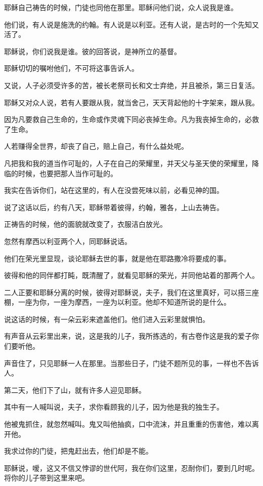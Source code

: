 \documentclass[12pt,oneside]{book}
\begin{document}
耶稣自己祷告的时候，门徒也同他在那里。耶稣问他们说，众人说我是谁。

他们说，有人说是施洗的约翰。有人说是以利亚。还有人说，是古时的一个先知又活了。

耶稣说，你们说我是谁。彼的回答说，是神所立的基督。

耶稣切切的嘱咐他们，不可将这事告诉人。

又说，人子必须受许多的苦，被长老祭司长和文士弃绝，并且被杀，第三日复活。

耶稣又对众人说，若有人要跟从我，就当舍己，天天背起他的十字架来，跟从我。

因为凡要救自己生命的，生命或作灵魂下同必丧掉生命。凡为我丧掉生命的，必救了生命。

人若赚得全世界，却丧了自己，赔上自己，有什么益处呢。

凡把我和我的道当作可耻的，人子在自己的荣耀里，并天父与圣天使的荣耀里，降临的时候，也要把那人当作可耻的。

我实在告诉你们，站在这里的，有人在没尝死味以前，必看见神的国。

说了这话以后，约有八天，耶稣带着彼得，约翰，雅各，上山去祷告。

正祷告的时候，他的面貌就改变了，衣服洁白放光。

忽然有摩西以利亚两个人，同耶稣说话。

他们在荣光里显现，谈论耶稣去世的事，就是他在耶路撒冷将要成的事。

彼得和他的同伴都打盹，既清醒了，就看见耶稣的荣光，并同他站着的那两个人。

二人正要和耶稣分离的时候，彼得对耶稣说，夫子，我们在这里真好，可以搭三座棚，一座为你，一座为摩西，一座为以利亚。他却不知道所说的是什么。

说这话的时候，有一朵云彩来遮盖他们。他们进入云彩里就惧怕。

有声音从云彩里出来，说，这是我的儿子，我所拣选的，有古卷作这是我的爱子你们要听他。

声音住了，只见耶稣一人在那里。当那些日子，门徒不题所见的事，一样也不告诉人。

第二天，他们下了山，就有许多人迎见耶稣。

其中有一人喊叫说，夫子，求你看顾我的儿子，因为他是我的独生子。

他被鬼抓住，就忽然喊叫。鬼又叫他抽疯，口中流沫，并且重重的伤害他，难以离开他。

我求过你的门徒，把鬼赶出去，他们却是不能。

耶稣说，嗳，这又不信又悖谬的世代阿，我在你们这里，忍耐你们，要到几时呢。将你的儿子带到这里来吧。
\end{document}
